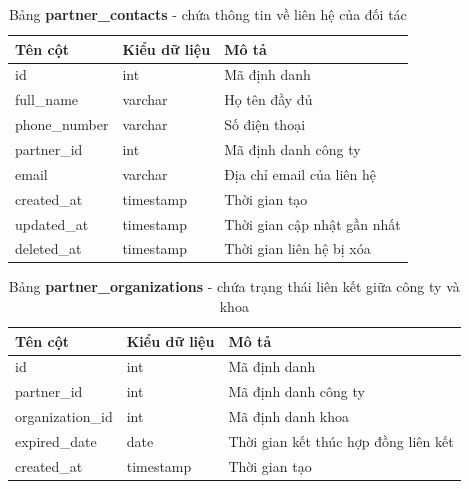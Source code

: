 \documentclass[./../main.tex]{subfiles}
\begin{document}
\begin{table}[H]
	\caption[Bảng partner\_contacts]{Bảng \textbf{partner\_contacts} - chứa thông tin về liên hệ của đối tác}
	\label{tab:db_partner_contacts}
	\begin{tabular}{|l|l|l|}
		\hline
		\textbf{Tên cột} & \textbf{Kiểu dữ liệu} & \textbf{Mô tả}              \\ \hline
		id               & int                   & Mã định danh                \\ \hline
		full\_name       & varchar               & Họ tên đầy đủ               \\ \hline
		phone\_number    & varchar               & Số điện thoại               \\ \hline
		partner\_id      & int                   & Mã định danh công ty        \\ \hline
		email            & varchar               & Địa chỉ email của liên hệ   \\ \hline
		created\_at      & timestamp             & Thời gian tạo               \\ \hline
		updated\_at      & timestamp             & Thời gian cập nhật gần nhất \\ \hline
		deleted\_at      & timestamp             & Thời gian liên hệ bị xóa    \\ \hline
	\end{tabular}
\end{table}

\begin{table}[H]
	\caption[Bảng partner\_organizations]{Bảng \textbf{partner\_organizations} - chứa trạng thái liên kết giữa công ty và khoa}
	\label{tab:db_partner_orgs}
	\begin{tabular}{|l|l|l|}
		\hline
		\textbf{Tên cột} & \textbf{Kiểu dữ liệu} & \textbf{Mô tả}                       \\ \hline
		id               & int                   & Mã định danh                         \\ \hline
		partner\_id      & int                   & Mã định danh công ty                 \\ \hline
		organization\_id & int                   & Mã định danh khoa                    \\ \hline
		expired\_date    & date                  & Thời gian kết thúc hợp đồng liên kết \\ \hline
		created\_at      & timestamp             & Thời gian tạo                        \\ \hline
	\end{tabular}
\end{table}
\end{document}
